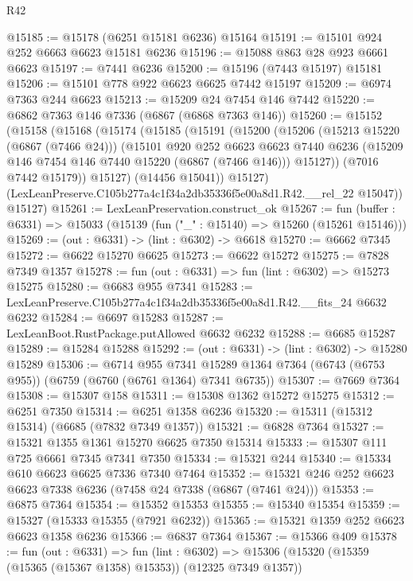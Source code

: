 \begin{lexlean}{R42}
\begin{coremodule}
{@15185 := @15178 (@6251 @15181 @6236) @15164
@15191 := @15101 @924 @252 @6663 @6623 @15181 @6236
@15196 := @15088 @863 @28 @923 @6661 @6623
@15197 := @7441 @6236
@15200 := @15196 (@7443 @15197) @15181
@15206 := @15101 @778 @922 @6623 @6625 @7442 @15197
@15209 := @6974 @7363 @244 @6623
@15213 := @15209 @24 @7454 @146 @7442
@15220 := @6862 @7363 @146 @7336 (@6867 (@6868 @7363 @146))
@15260 := @15152
    (@15158
      (@15168
        (@15174
          (@15185
            (@15191
              (@15200
                (@15206
                  (@15213 @15220 (@6867 (@7466 @24)))
                  (@15101
                    @920
                    @252
                    @6623
                    @6623
                    @7440
                    @6236
                    (@15209 @146 @7454 @146 @7440 @15220 (@6867 (@7466 @146)))
                    @15127))
                (@7016 @7442 @15179))
              @15127)
            (@14456 @15041))
          @15127)
        (LexLeanPreserve.C105b277a4c1f34a2db35336f5e00a8d1.R42.__rel_22 @15047))
      @15127)
@15261 := LexLeanPreservation.construct_ok
@15267 := fun (buffer : @6331) => @15033 (@15139 (fun ("_" : @15140) => @15260 (@15261 @15146)))
@15269 := (out : @6331) -> (lint : @6302) -> @6618
@15270 := @6662 @7345
@15272 := @6622 @15270 @6625
@15273 := @6622 @15272
@15275 := @7828 @7349 @1357
@15278 := fun (out : @6331) => fun (lint : @6302) => @15273 @15275
@15280 := @6683 @955 @7341
@15283 := LexLeanPreserve.C105b277a4c1f34a2db35336f5e00a8d1.R42.__fits_24 @6632 @6232
@15284 := @6697 @15283
@15287 := LexLeanBoot.RustPackage.putAllowed @6632 @6232
@15288 := @6685 @15287
@15289 := @15284 @15288
@15292 := (out : @6331) -> (lint : @6302) -> @15280 @15289
@15306 := @6714
    @955
    @7341
    @15289
    @1364
    @7364
    (@6743 (@6753 @955))
    (@6759 (@6760 (@6761 @1364) @7341 @6735))
@15307 := @7669 @7364
@15308 := @15307 @158
@15311 := @15308 @1362 @15272 @15275
@15312 := @6251 @7350
@15314 := @6251 @1358 @6236
@15320 := @15311 (@15312 @15314) (@6685 (@7832 @7349 @1357))
@15321 := @6828 @7364
@15327 := @15321 @1355 @1361 @15270 @6625 @7350 @15314
@15333 := @15307 @111 @725 @6661 @7345 @7341 @7350
@15334 := @15321 @244
@15340 := @15334 @610 @6623 @6625 @7336 @7340 @7464
@15352 := @15321 @246 @252 @6623 @6623 @7338 @6236 (@7458 @24 @7338 (@6867 (@7461 @24)))
@15353 := @6875 @7364
@15354 := @15352 @15353
@15355 := @15340 @15354
@15359 := @15327 (@15333 @15355 (@7921 @6232))
@15365 := @15321 @1359 @252 @6623 @6623 @1358 @6236
@15366 := @6837 @7364
@15367 := @15366 @409
@15378 := fun (out : @6331) =>
  fun (lint : @6302) => @15306 (@15320 (@15359 (@15365 (@15367 @1358) @15353)) (@12325 @7349 @1357))
}
\end{coremodule}
\end{lexlean}
